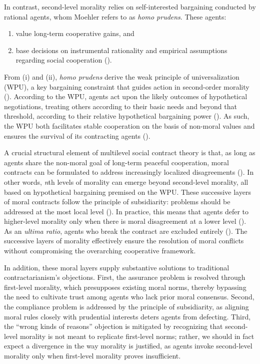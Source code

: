 \documentclass[12pt, a4paper, twoside]{article}
\begin{document}
In contrast, second-level morality relies on self-interested bargaining conducted by rational agents, whom Moehler refers to as \emph{homo prudens}. These agents:
\begin{enumerate}

\item value long-term cooperative gains, and

\item base decisions on instrumental rationality and empirical assumptions regarding social cooperation (\cites[p.\ 8, 48]{moehler2020contractarianism}[p.\ 234]{moehler2024diversity}).

\end{enumerate}
From (i) and (ii), \emph{homo prudens} derive the weak principle of universalization (WPU), a key bargaining constraint that guides action in second-order morality (\cite[pp.\ 48–52]{moehler2020contractarianism}). According to the WPU, agents act upon the likely outcomes of hypothetical negotiations, treating others according to their basic needs and beyond that threshold, according to their relative hypothetical bargaining power (\cite[p.\ 50]{moehler2020contractarianism}). As such, the WPU both facilitates stable cooperation on the basis of non-moral values
and ensures the survival of its contracting agents (\cite[p. 50]{moehler2020contractarianism}).

A crucial structural element of multilevel social contract theory is that, as long as agents share the non-moral goal of long-term peaceful cooperation, moral contracts can be formulated to address increasingly localized disagreements (\cite[p.\ 54]{moehler2020contractarianism}). In other words, \emph{n}th levels of morality can emerge beyond second-level morality, all based on hypothetical bargaining premised on the WPU. These successive layers of moral contracts follow the principle of subsidiarity: problems should be addressed at the most local level (\cite{merriamwebster2025}). In practice, this means that agents defer to higher-level morality only when there is moral disagreement at a lower level (\cite[p.\ 235]{moehler2024diversity}). As an \emph{ultima ratio}, agents who break the contract are excluded entirely (\cite[p.\ 58]{moehler2020contractarianism}). The successive layers of morality effectively ensure the resolution of moral conflicts without compromising the overarching cooperative framework.

In addition, these moral layers supply substantive solutions to traditional contractarianism’s objections. First, the assurance problem is resolved through first-level morality, which presupposes existing moral norms, thereby bypassing the need to cultivate trust among agents who lack prior moral consensus. Second, the compliance problem is addressed by the principle of subsidiarity, as aligning moral rules closely with prudential interests deters agents from defecting. Third, the “wrong kinds of reasons” objection is mitigated by recognizing that second-level morality is not meant to replicate first-level norms; rather, we should in fact expect a divergence in the way morality is justified, as agents invoke second-level morality only when first-level morality proves insufficient.
\end{document}
